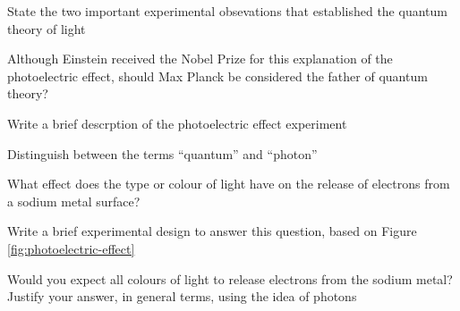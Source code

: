 \begin{problems}
    \item State the two important experimental obsevations that established the quantum theory
        of light
    \item Although Einstein received the Nobel Prize for this explanation of the photoelectric
        effect, should Max Planck be considered the father of quantum theory?
    \item Write a brief descrption of the photoelectric effect experiment
    \item Distinguish between the terms ``quantum'' and ``photon''
    \item What effect does the type or colour of light have on the release of electrons from a
        sodium metal surface?
        \begin{enum-alph}
            \item Write a brief experimental design to answer this question, based on Figure
                \ref{fig:photoelectric-effect}
            \item Would you expect all colours of light to release electrons from the sodium
                metal? Justify your answer, in general terms, using the idea of photons
        \end{enum-alph}
\end{problems}
